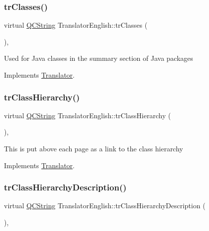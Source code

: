 \subsubsection{\texorpdfstring{trClasses()}{trClasses()}}
{\footnotesize\ttfamily virtual \mbox{\hyperlink{class_q_c_string}{Q\+C\+String}} Translator\+English\+::tr\+Classes (\begin{DoxyParamCaption}{ }\end{DoxyParamCaption})\hspace{0.3cm}{\ttfamily [inline]}, {\ttfamily [virtual]}}

Used for Java classes in the summary section of Java packages 

Implements \mbox{\hyperlink{class_translator}{Translator}}.

\mbox{\label{class_translator_english_a6918b8c8cd9a66bde8d4d16a7841eb6a}} 
\subsubsection{\texorpdfstring{trClassHierarchy()}{trClassHierarchy()}}
{\footnotesize\ttfamily virtual \mbox{\hyperlink{class_q_c_string}{Q\+C\+String}} Translator\+English\+::tr\+Class\+Hierarchy (\begin{DoxyParamCaption}{ }\end{DoxyParamCaption})\hspace{0.3cm}{\ttfamily [inline]}, {\ttfamily [virtual]}}

This is put above each page as a link to the class hierarchy 

Implements \mbox{\hyperlink{class_translator}{Translator}}.

\mbox{\label{class_translator_english_a86ef64db906e5b6a598b55b7cd8bdd9b}} 
\subsubsection{\texorpdfstring{trClassHierarchyDescription()}{trClassHierarchyDescription()}}
{\footnotesize\ttfamily virtual \mbox{\hyperlink{class_q_c_string}{Q\+C\+String}} Translator\+English\+::tr\+Class\+Hierarchy\+Description (\begin{DoxyParamCaption}{ }\end{DoxyParamCaption})\hspace{0.3cm}{\ttfamily [inline]}, {\ttfamily [virtual]}}

